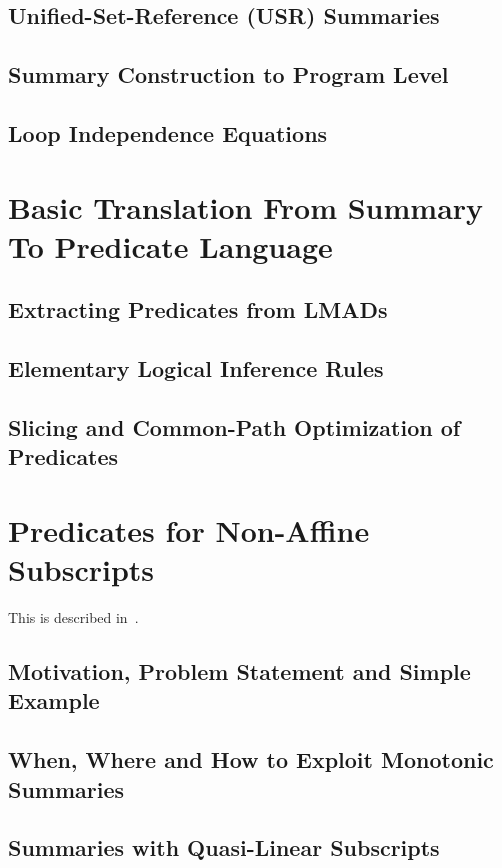 \documentclass[prodmode,acmtecs]{acmsmall}
\begin{document}
\subsection{Unified-Set-Reference (USR) Summaries}

\subsection{Summary Construction to Program Level}

\subsection{Loop Independence Equations}


\section{Basic Translation From Summary To Predicate Language}

\subsection{Extracting Predicates from LMADs}

\subsection{Elementary Logical Inference Rules}

\subsection{Slicing and Common-Path Optimization of Predicates}


\section{Predicates for Non-Affine Subscripts}
    This is described in~\cite{SummaryMonot}.

\subsection{Motivation, Problem Statement and Simple Example}

\subsection{When, Where and How to Exploit Monotonic Summaries}

\subsection{Summaries with Quasi-Linear Subscripts}
\end{document}

